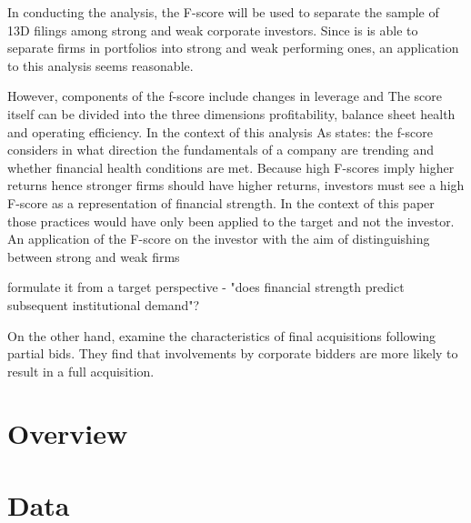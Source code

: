 \documentclass[12pt]{article}
\begin{document}
 In conducting the analysis, the F-score will be used to separate  the sample of 13D filings among strong and weak corporate investors. Since is is able to separate firms in portfolios into strong and weak performing ones, an application to this analysis seems reasonable. 
 
 However, components of the f-score include changes in leverage and The score itself can be divided into the three dimensions profitability, balance sheet health and operating efficiency. 
 In the context of this analysis As \citet{Mohr2012} states: the f-score considers in what direction the fundamentals of a company are trending and whether financial health conditions are met.  Because high F-scores imply higher returns hence stronger firms should have higher returns, investors must see a high F-score as a representation of financial strength. In the context of this paper those practices would have only been applied to the target and not the investor. An application of the F-score on the investor with the aim of distinguishing between strong and weak firms 


\citet{Choi2012} formulate it from a target perspective - "does financial strength predict subsequent institutional demand"? 


On the other hand, \citet{Akhigbe2007} examine the characteristics of final acquisitions following partial bids. They find that involvements by corporate bidders are more likely to result in a full acquisition. 


\section{Overview}
\section{Data}
\end{document}
